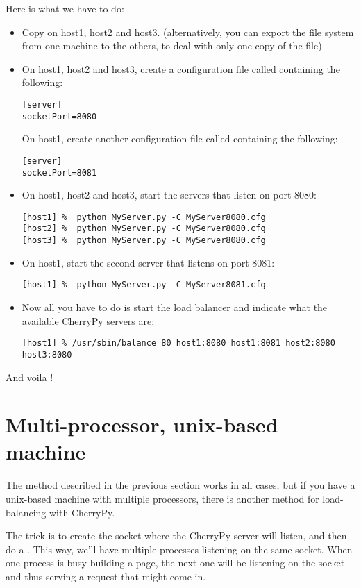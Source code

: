\documentclass{manual}
\begin{document}
Here is what we have to do:
\begin{itemize}
\item
Copy  on host1, host2 and host3. (alternatively, you can export the file system from one machine to the others, to deal with only one copy of the file)
\item
On host1, host2 and host3, create a configuration file called  containing the following:
\begin{verbatim}
[server]
socketPort=8080
\end{verbatim}
On host1, create another configuration file called  containing the following:
\begin{verbatim}
[server]
socketPort=8081
\end{verbatim}
\item
On host1, host2 and host3, start the servers that listen on port 8080:
\begin{verbatim}
[host1] %  python MyServer.py -C MyServer8080.cfg
[host2] %  python MyServer.py -C MyServer8080.cfg
[host3] %  python MyServer.py -C MyServer8080.cfg
\end{verbatim}
\item
On host1, start the second server that listens on port 8081:
\begin{verbatim}
[host1] %  python MyServer.py -C MyServer8081.cfg
\end{verbatim}
\item
Now all you have to do is start the load balancer and indicate what the available CherryPy servers are:
\begin{verbatim}
[host1] % /usr/sbin/balance 80 host1:8080 host1:8081 host2:8080 host3:8080
\end{verbatim}
\end{itemize}
And voila !

\section{Multi-processor, unix-based machine}
The method described in the previous section works in all cases, but if you have a unix-based machine with multiple
processors, there is another method for load-balancing with CherryPy.

The trick is to create the socket where the CherryPy server will listen, and then do a . This way, we'll
have multiple processes listening on the same socket. When one process is busy building a page, the next one will be
listening on the socket and thus serving a request that might come in.
\end{document}
